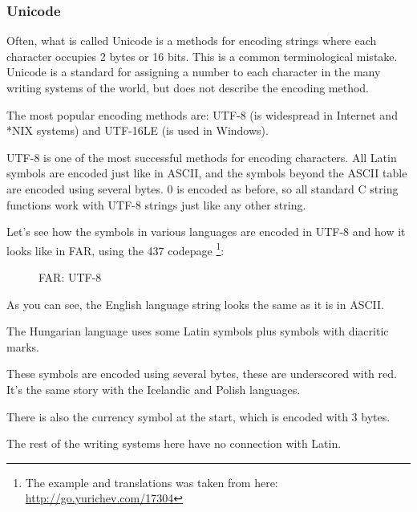 \subsubsection{Unicode}


Often, what is called Unicode is a methods for encoding strings where each character occupies 2 bytes or 16 bits.
This is a common terminological mistake.
Unicode is a standard for assigning a number to each character in the many writing systems of the 
world, but does not describe the encoding method.

The most popular encoding methods are: UTF-8 (is widespread in Internet and *NIX systems) and UTF-16LE (is used in Windows).


UTF-8 is one of the most successful methods for
encoding characters.
All Latin symbols are encoded just like in ASCII,
and the symbols beyond the ASCII table are encoded using several bytes.
0 is encoded as
before, so all standard C string functions work with UTF-8 strings just like any other string.

Let's see how the symbols in various languages are encoded in UTF-8 and how it looks like in FAR, using the 437 codepage
\footnote{The example and translations was taken from here: 
\url{http://go.yurichev.com/17304}}:

\begin{figure}[H]
\centering
{}
\end{figure}

\begin{figure}[H]
\centering
{}
\caption{FAR: UTF-8}
\end{figure}

As you can see, the English language string looks the same as it is in ASCII.

The Hungarian language uses some Latin symbols plus symbols with diacritic marks.

These symbols are encoded using several bytes, these are underscored with red.
It's the same story with the Icelandic and Polish languages.

There is also the  currency symbol at the start, which is encoded with 3 bytes.

The rest of the writing systems here have no connection with Latin.

